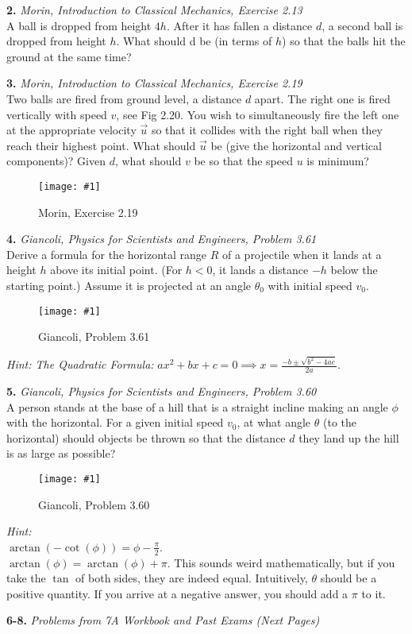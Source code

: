 \documentclass[11pt]{article}
\newcommand{\fig}[4]{
    \begin{figure}[H]
        \centering
        \texttt{[image: \#1]}
        \caption{#2}
        \label{exp4fit}
    \end{figure}
}
\theoremstyle{gangnamstyle}{\newtheorem{definition}{Definition}[]}
\theoremstyle{gangnamstyle}{\newtheorem{example}{Example}[]}
\theoremstyle{gangnamstyle}{\newtheorem{problem}{Problem}[]}
\begin{document}
\textbf{2.} \textit{Morin, Introduction to Classical Mechanics, Exercise 2.13} \\
A ball is dropped from height $4h$. After it has fallen a distance $d$, a second ball is dropped from height $h$. What should d be (in terms of $h$) so that the balls hit the ground at the same time?

\vspace{2 in}

\textbf{3.} \textit{Morin, Introduction to Classical Mechanics, Exercise 2.19} \\
Two balls are fired from ground level, a distance $d$ apart. The right one is
fired vertically with speed $v$, see Fig 2.20. You wish to simultaneously fire the left one at the appropriate velocity $\Vec{u}$ so that it collides with the right ball when they reach their highest point. What should $\Vec{u}$ be (give the horizontal and vertical components)? Given $d$, what should $v$ be so that the speed $u$ is minimum?
\fig{figs/0624/morin219.png}{Morin, Exercise 2.19}{0.75}{0}
\vspace{1 in}


\textbf{4.} \textit{Giancoli, Physics for Scientists and Engineers, Problem 3.61} \\
Derive a formula for the horizontal range $R$ of a projectile when it lands at a height $h$ above its initial point. (For $h < 0$, it lands a distance $-h$ below the starting point.) Assume it is projected at an angle $\theta_0$ with initial speed $v_0$.
\fig{figs/0624/giancoli361.png}{Giancoli, Problem 3.61}{0.75}{0}
\textit{Hint: The Quadratic Formula:} $ax^2 + bx + c = 0 \implies x = \frac{-b \pm \sqrt{b^2 - 4ac}}{2a}$. \\
\vspace{3 in}

\textbf{5.} \textit{Giancoli, Physics for Scientists and Engineers, Problem 3.60} \\
A person stands at the base of a hill that is a straight incline making an angle $\phi$ with the horizontal. For a given initial speed $v_0$, at what angle $\theta$ (to the horizontal) should objects be thrown so that the distance $d$ they land up the hill is as large as possible?
\fig{figs/0624/giancoli360.png}{Giancoli, Problem 3.60}{0.75}{0}
\textit{Hint:} \\
$\arctan(-\cot(\phi)) = \phi - \frac{\pi}{2}$. \\
$\arctan(\phi) = \arctan(\phi) + \pi$. This sounds weird mathematically, but if you take the $\tan$ of both sides, they are indeed equal. Intuitively, $\theta$ should be a positive quantity. If you arrive at a negative answer, you should add a $\pi$ to it. 
\vspace{2 in}

\textbf{6-8.} \textit{Problems from 7A Workbook and Past Exams (Next Pages)}
\vspace{1 in}




\end{document}
